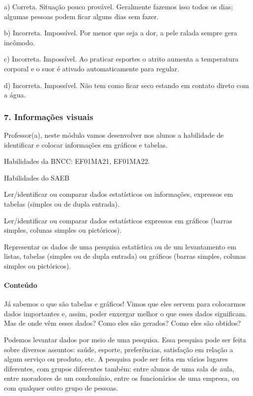 a) Correta. Situação pouco provável. Geralmente fazemos isso todos os
dias; algumas pessoas podem ficar alguns dias sem fazer.

b) Incorreta. Impossível. Por menor que seja a dor, a pele ralada sempre gera incômodo.

c) Incorreta. Impossível. Ao praticar esportes o atrito aumenta a
temperatura corporal e o suor é ativado automaticamente para regular.

d) Incorreta. Impossível. Não tem como ficar seco estando em contato direto com a água.

\subsubsection{7. Informações visuais
}\label{muxf3dulo-7-faz-uma-tabelinha}

Professor(a), neste módulo vamos desenvolver nos alunos a habilidade de identificar e colocar informações em gráficos e tabelas. 

Habilidades da BNCC: EF01MA21, EF01MA22.

Habilidades do SAEB

Ler/identificar ou comparar dados estatísticos ou informações, expressos em tabelas (simples ou de dupla entrada).

Ler/identificar ou comparar dados estatísticos expressos em gráficos (barras simples, colunas simples ou pictóricos).

Representar os dados de uma pesquisa estatística ou de um levantamento
em listas, tabelas (simples ou de dupla entrada) ou gráficos (barras
simples, colunas simples ou pictóricos).

\paragraph{Conteúdo}\label{conteuxfado-6}

Já sabemos o que são tabelas e gráficos! Vimos que eles servem para
colocarmos dados importantes e, assim, poder enxergar melhor o que esses
dados significam. Mas de onde vêm esses dados? Como eles são gerados? Como eles são obtidos?

Podemos levantar dados por meio de uma pesquisa. Essa pesquisa pode ser
feita sobre diversos assuntos: saúde, esporte, preferências, satisfação em relação a algum serviço ou produto, etc. A pesquisa pode ser feita em vários
lugares diferentes, com grupos diferentes também: entre alunos de uma
sala de aula, entre moradores de um condomínio, entre os funcionários de
uma empresa, ou com qualquer outro grupo de pessoas.

